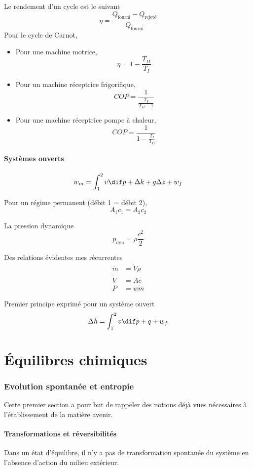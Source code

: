 Le rendement d'un cycle est le suivant
\[ \eta = \frac{Q_\mathrm{fourni} - Q_\mathrm{rejeté}}{Q_\mathrm{fourni}} \]
Pour le cycle de Carnot,
\begin{itemize}
  \item Pour une machine motrice,
    \[ \eta = 1 - \frac{T_{II}}{T_I} \]
  \item Pour un machine réceptrice frigorifique,
    \[ COP = \frac{1}{\frac{T_I}{T_{II}-1}} \]
  \item Pour une machine réceptrice pompe à chaleur,
    \[ COP = \frac{1}{1-\frac{T_I}{T_{II}}} \]
\end{itemize}

\subsection{Systèmes ouverts}
\[ w_m = \int_1^2v\dif p + \Delta k + g\Delta z + w_f \]

Pour un régime permanent (débit 1 = débit 2),
\[ A_1 c_1 = A_2 c_2 \]

La pression dynamique
\[ p_\mathrm{dyn} = \rho \frac{c^2}{2} \]

Des relations évidentes mes récurrentes
\begin{align*}
  \dot{m} & = \dot{V} \rho\\
  \dot{V} & = A c\\
  P & = w \dot{m}
\end{align*}

Premier principe exprimé pour un système ouvert
\[ \Delta h = \int_1^2 v \dif p + q + w_f \]

\part{Équilibres chimiques}
\section{Evolution spontanée et entropie}
Cette premier section a pour but de rappeler des notions déjà vues nécessaires
à l'établissement de la matière avenir.

\subsection{Transformations et réversibilités}
Dans un état d'équilibre, il n'y a pas de transformation spontanée du système
en l'absence d'action du milieu extérieur.

